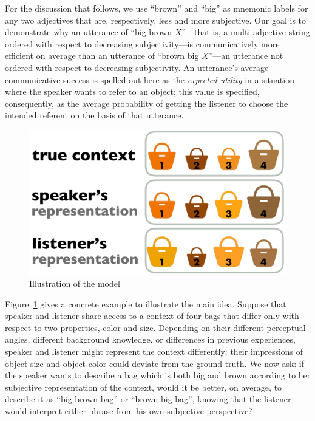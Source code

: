 \documentclass[10pt,a4paper]{article}
\begin{document}
For the discussion that follows, we use ``brown'' and ``big'' as mnemonic labels for any two adjectives that are, respectively, less and more subjective. Our goal is to demonstrate why an utterance of ``big brown $X$''---that is, a multi-adjective string ordered with respect to decreasing subjectivity---is communicatively more efficient on average than an utterance of ``brown big $X$''---an utterance not ordered with respect to decreasing subjectivity. An utterance's average communicative success is spelled out here as the \emph{expected utility} in a situation where the speaker wants to refer to an object; this value is specified, consequently, as the average probability of getting the listener to choose the intended referent on the basis of that utterance.

\begin{figure}[t]
  \centering
 \includegraphics[width=\linewidth]{model_picture.pdf} 
  \caption{Illustration of the model}
  \label{fig:ModelIllustration}
\end{figure}


Figure~\ref{fig:ModelIllustration} gives a concrete example to illustrate the main idea. Suppose that speaker and listener share access to a context of four bags that differ only with respect to two properties, color and size. Depending on their different perceptual angles, different background knowledge, or differences in previous experiences, speaker and listener might represent the context differently: their impressions of object size and object color could deviate from the ground truth. We now ask: if the speaker wants to describe a bag which is both big and brown according to her subjective representation of the context, would it be better, on average, to describe it as ``big brown bag'' or ``brown big bag'', knowing that the listener would interpret either phrase from his own subjective perspective?
\end{document}
